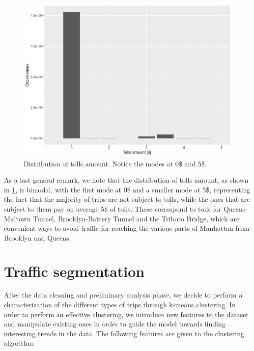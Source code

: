 \documentclass{acm_proc_article-sp-sigmod09}
\begin{document}
\begin{figure}
	\centering
	\includegraphics[width=1\columnwidth]{resources/base_plots/tolls_amount_distr.pdf}
	\caption{Distribution of tolls amount. Notice the modes at 0\$ and 5\$.}
	\label{fig:tollsAmountDistr}
\end{figure}

As a last general remark, we note that the distribution of tolls amount, as shown in \cref{fig:tollsAmountDistr}, is bimodal, with the first mode at 0\$ and a smaller mode at 5\$, representing the fact that the majority of trips are not subject to tolls, while the ones that are subject to them pay on average 5\$ of tolls. These correspond to tolls for Queens-Midtown Tunnel, Brooklyn-Battery Tunnel and the Triboro Bridge, which are convenient ways to avoid traffic for reaching the various parts of Manhattan from Brooklyn and Queens.

\section{Traffic segmentation}

After the data cleaning and preliminary analysis phase, we decide to perform a characterization of the different types of trips through k-means clustering. In order to perform an effective clustering, we introduce new features to the dataset and manipulate existing ones in order to guide the model towards finding interesting trends in the data. The following features are given to the clustering algorithm:
\end{document}
